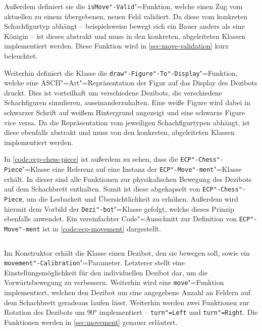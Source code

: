 \begin{listing}[h]
    \inputminted{cpp}{../assets/code/ECPChessPiece.cpp}
    \caption{Definition von \texttt{ECP"-Chess"-Piece} (vereinfacht)}
    \label{code:ecp-chess-piece}
\end{listing}


Außerdem definiert sie die \texttt{isMove"-Valid}"=Funktion, welche einen Zug vom aktuellen zu einem übergebenen, neuen Feld validiert. Da diese vom konkreten Schachfigurtyp abhängt -- beispielsweise bewegt sich ein Bauer anders als eine Königin -- ist dieses abstrakt und muss in den konkreten, abgeleiteten Klassen implementiert werden. Diese Funktion wird in \autoref{sec:move-validation} kurz beleuchtet.

Weiterhin definiert die Klasse die \texttt{draw"-Figure"-To"-Display}"=Funktion, welche eine ASCII"=Art"=Repräsentation der Figur auf das Display des Dezibots druckt. Dies ist vorteilhaft um verschiedene Dezibots, die verschiedene Schachfiguren simulieren, auseinanderzuhalten. Eine weiße Figure wird dabei in schwarzer Schrift auf weißem Hintergrund angezeigt und eine schwarze Figure vice versa. Da die Repräsentation vom jeweiligen Schachfigurtypen abhängt, ist diese ebenfalls abstrakt und muss von den konkreten, abgeleiteten Klassen implementiert werden.


In \autoref{code:ecp-chess-piece} ist außerdem zu sehen, dass die \texttt{ECP"-Chess"-Piece}"=Klasse eine Referenz auf eine Instanz der \texttt{ECP"-Move"-ment}"=Klasse erhält. In dieser sind alle Funktionen zur physikalischen Bewegung des Dezibots auf dem Schachbrett enthalten. Somit ist diese abgekapselt von \texttt{ECP"-Chess"-Piece}, um die Lesbarkeit und Übersichtlichkeit zu erhöhen. Außerdem wird hiermit dem Vorbild der \texttt{Dezi"-bot}"=Klasse gefolgt, welche dieses Prinzip ebenfalls anwendet. Ein vereinfachter Code"=Ausschnitt zur Definition von \texttt{ECP"-Move"-ment} ist in \autoref{code:ecp-movement} dargestellt.

\begin{listing}[h]
    \inputminted{cpp}{../assets/code/ECPMovement.cpp}
    \caption{Vereinfachter Code"=Ausschnitt zur \texttt{ECP"-Move"-ment}"=Klasse}
    \label{code:ecp-movement}
\end{listing}

Im Konstruktor erhält die Klasse einen Dezibot, den sie bewegen soll, sowie ein \texttt{movement"-Calibration}"=Parameter. Letzterer stellt eine Einstellungsmöglichkeit für den individuellen Dezibot dar, um die Vorwärtsbewegung zu verbessern. Weiterhin wird eine \texttt{move}"=Funktion implementiert, welchen den Dezibot um eine angegebene Anzahl an Feldern auf dem Schachbrett geradeaus laufen lässt. Weiterhin werden zwei Funktionen zur Rotation des Dezibots um 90° implementiert -- \texttt{turn"=Left} und \texttt{turn"=Right}. Die Funktionen werden in \autoref{sec:movement} genauer erläutert.

